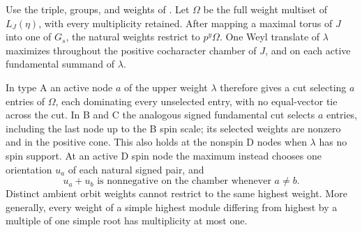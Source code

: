 \begin{lemma}\label{w:universal-cuts}
Use the triple, groups, and weights of . Let $\Omega$ be the full weight multiset of $L_J(\eta)$, with every multiplicity retained. After mapping a maximal torus of $J$ into one of $G_s$, the natural weights restrict to $p^y\Omega$. One Weyl translate of $\lambda$ maximizes throughout the positive cocharacter chamber of $J$, and on each active fundamental summand of $\lambda$.

In type A an active node $a$ of the upper weight $\lambda$ therefore
gives a cut selecting $a$ entries of $\Omega$, each dominating every
unselected entry, with no equal-vector tie across the cut. In B and C
the analogous signed fundamental cut selects $a$ entries, including
the last node up to the B spin scale; its selected weights are nonzero
and in the positive cone. This also holds at the nonspin D nodes when
$\lambda$ has no spin support. At an active D spin node the maximum
instead chooses one orientation $u_a$ of each natural signed pair, and
\[
 u_a+u_b\text{ is nonnegative on the chamber whenever }a\ne b.
\]
Distinct ambient orbit weights cannot restrict to the same highest weight. More generally, every weight of a simple highest module differing from highest by a multiple of one simple root has multiplicity at most one.
\end{lemma}
